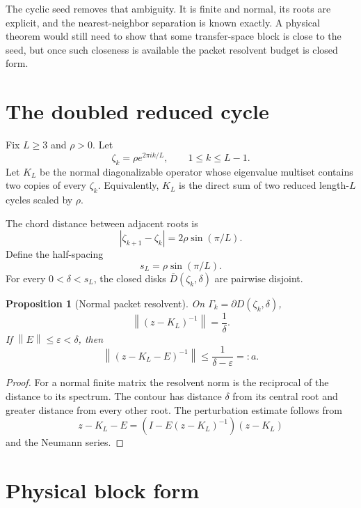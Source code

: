 \documentclass[12pt]{article}
\newtheorem{proposition}[theorem]{Proposition}
\theoremstyle{remark}
\newcommand{\norm}[1]{\left\lVert#1\right\rVert}
\begin{document}
The cyclic seed removes that ambiguity.  It is finite and normal, its roots
are explicit, and the nearest-neighbor separation is known exactly.  A
physical theorem would still need to show that some transfer-space block is
close to the seed, but once such closeness is available the packet resolvent
budget is closed form.

\section{The doubled reduced cycle}

Fix $L\ge3$ and $\rho>0$.  Let
\begin{equation}\label{eq:roots}
 \zeta_k=\rho e^{2\pi ik/L},
 \qquad 1\le k\le L-1.
\end{equation}
Let $K_L$ be the normal diagonalizable operator whose eigenvalue multiset
contains two copies of every $\zeta_k$.  Equivalently, $K_L$ is the direct
sum of two reduced length-$L$ cycles scaled by $\rho$.

The chord distance between adjacent roots is
\[
 |\zeta_{k+1}-\zeta_k|=2\rho\sin(\pi/L).
\]
Define the half-spacing
\begin{equation}\label{eq:spacing}
 s_L=\rho\sin(\pi/L).
\end{equation}
For every $0<\delta<s_L$, the closed disks
$\overline D(\zeta_k,\delta)$ are pairwise disjoint.

\begin{proposition}[Normal packet resolvent]\label{prop:normal-resolvent}
On $\Gamma_k=\partial D(\zeta_k,\delta)$,
\begin{equation}\label{eq:seed-resolvent}
 \norm{(z-K_L)^{-1}}=\frac1\delta.
\end{equation}
If $\norm E\le\varepsilon<\delta$, then
\begin{equation}\label{eq:perturbed-packet-resolvent}
 \norm{(z-K_L-E)^{-1}}
 \le\frac1{\delta-\varepsilon}
 =:a.
\end{equation}
\end{proposition}

\begin{proof}
For a normal finite matrix the resolvent norm is the reciprocal of the
distance to its spectrum.  The contour has distance $\delta$ from its central
root and greater distance from every other root.  The perturbation estimate
follows from
\[
 z-K_L-E=(I-E(z-K_L)^{-1})(z-K_L)
\]
and the Neumann series.
\end{proof}

\section{Physical block form}
\end{document}
